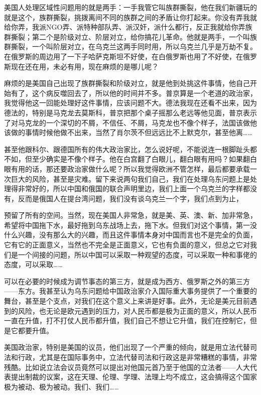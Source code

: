 \documentclass[UTF8, 12pt, a4paper]{ctexrep}
\begin{document}
美国人处理区域性问题用的就是两手：一手我管它叫族群撕裂，他在我们新疆玩的就是这个，族群撕裂，挑拨离间不同的族群之间的矛盾让你打起来。你没有弄我就给你弄，我派NGO弄、派特种部队弄、派汉奸，派什么都行，反正我就给你弄族群撕裂；第二个是阶级对立、阶层对立，给你搞花儿革命。他就是两手，一个叫族群撕裂，一个叫阶层对立，在乌克兰这两手同时用，所以乌克兰几乎是万劫不复。在俄罗斯的周边用了一下子哈萨克斯坦不好使，在白俄罗斯也用了不好使，在俄罗斯现在还在用，未必有用，现在麻烦的是哪儿呢？

麻烦的是美国自己出现了族群撕裂和阶级对立，就是他到处挑这件事情，他自己开始有了，这个病反噬回去了，所以他的时间并不多。普京算是一个老道的政治家，我觉得他这一回能处理好这件事情，应该问题不大。德法我现在还看不出来，因为德法的，特别是马克龙去莫斯科，普京把那个桌子摇那么老远等他见面，普京表示了对马克龙的一个深切的不屑，不信任、不屑，马克龙也不像个样子，法国该做他该做的事情时候他做不出来，当然了肖尔茨不但远远比不上默克尔，甚至他离……

甚至他跟科尔、跟德国所有的伟大政治家比，怎么说好呢，不能说连一根脚趾头都不如，但至少确实是不像个样子。他在白宫翻了白眼儿，翻白眼有用吗？如果翻白眼有用的话，那还要政治家做什么呢？所以我觉得欧洲不管怎样，最后都要承载一次巨大的风险，甚至是灾难。留下来说两句我们自己，我们在处理乌东问题上是处理得非常好的，所以中国和俄国的联合声明里边，我们上面一个乌克兰的字样都没有，反而是俄国人在提台湾问题，我们没有谈乌克兰一个字，我们点到为止，

预留了所有的空间。当然，现在美国人非常急，就是美、英、澳、新、加非常急，希望将中国拖下水，最好拖到乌东战场上去，拖下水。但我们对这个事情，第一没什么兴趣，没有那么大的兴趣，而且这件事情本身对中国而言也不是完全的负面，它有它的正面意义，当然也不完全是正面意义，它也有负面的意义，但总之它对我们是一个间接的问题，所以中国可以采取一种观望的态度，可以采取一种和事佬的态度，可以采取……

可以在必要的时候成为调节事态的第三方，就是成为西方、俄罗斯之外的第三方——东方。我甚至认为乌东问题给中国政治家介入国际重大事务提供了一个重要的舞台，甚至是个支点，对我们在这个意义上来讲是好事。此外，无论是美元目前遇到的风险，也无论是欧元遇到的压力，对人民币都是极为正面的意义，所以人民币一直在升值，打不打仗人民币都升值，我们自己不想让它升值，我们在控制它，但是它都要升值。

美国政治家，特别是美国的议员，他们出现了一个严重的倾向，就是用立法代替司法和行政，尤其是在国际事务中，立法代替司法和行政这是非常糟糕的事情，非常残酷。比如说立法会议员竟然可以提出对他国元首乃至于他国的立法者——人大代表提出制裁的议案，这在天理、伦理、学理、法理上均不成立，这会搞得这个国家极为被动、极为被动。我们、我们……
\end{document}
